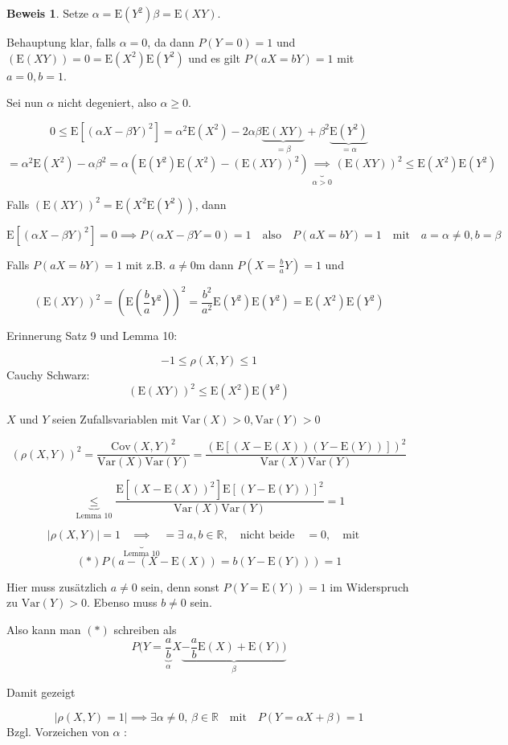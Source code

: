 \documentclass[12pt, a4paper]{article}
\newcommand{\E}{\mbox{I\negthinspace E}}
\theoremstyle{plain}
\theoremstyle{definition}
\newtheorem*{beweis}{Beweis}
\newcommand{\R}{\mathbb{R}}
\newcommand{\1}{\mathds{1}}
\renewcommand{\E}{\mathrm{E}}
\newcommand{\Var}{\mathrm{Var}}
\newcommand{\Cov}{\mathrm{Cov}}
\providecommand{\abs}[1]{\lvert#1\rvert}
\providecommand{\mtext}[1]{\quad \text{#1} \quad}
\begin{document}
\begin{beweis} Setze $\alpha = \E(Y^2) \beta=\E(XY)$. \end{beweis} Behauptung klar, falls $\alpha =0$, da dann $P(Y=0)=1$ und $(\E(XY)) = 0 = \E(X^2)\E(Y^2)$ und es gilt $P(aX=bY)=1$ mit $a=0, b=1$.

Sei nun $\alpha$ nicht degeniert, also $\alpha \geq 0$.

\[ 0\leq  \E[(\alpha X - \beta Y)^2] = \alpha^2 \E(X^2) - 2\alpha\beta \underbrace{\E(XY)}_{=\beta} + \beta^2\underbrace{\E(Y^2)}_{=\alpha} \]
\[=   \alpha^2 \E(X^2) - \alpha\beta^2 = \alpha( \E(Y^2)\E(X^2) - (\E(XY))^2)  \underbrace{\implies}_{\alpha>0} (\E(XY))^2 \leq \E(X^2)\E(Y^2)  \]

Falls $(\E(XY))^2 = \E(X^2 \E(Y^2))$, dann

\[  \E[(\alpha X -\beta Y)^2] = 0 \implies P(\alpha X - \beta Y = 0) = 1 \mtext{also} P(aX=bY)=1 \mtext{mit} a = \alpha \neq 0, b = \beta        \]

Falls $P(aX = bY) = 1$ mit z.B. $a \neq 0$m dann $P(X=\frac{b}{a}Y)=1$ und 

\[  (\E(XY))^2 = (\E(\frac{b}{a}Y^2))^2   = \frac{b^2}{a^2} \E(Y^2) \E(Y^2) = \E(X^2)\E(Y^2)   \]



Erinnerung Satz 9 und Lemma 10: 

\[-1 \leq \rho(X,Y) \leq 1\]
Cauchy Schwarz: \[(\E(XY))^2 \leq \E(X^2)\E(Y^2) \]


$X$ und $Y$ seien Zufallsvariablen mit $\Var(X) > 0, \Var (Y) > 0$

\[ (\rho(X,Y))^2 = \frac{\Cov(X,Y)^2}{\Var(X)\Var(Y)} = \frac{(\E[(X-\E(X)) (Y-\E(Y))])^2}{\Var(X)\Var(Y)}    \]

\[    \underbrace{\leq}_{\text{Lemma 10}} \frac{\E[(  X-\E(X) )^2]  \E[(Y-\E(Y))]^2  }{\Var(X)\Var(Y)} = 1         \]

\[ \abs{\rho(X,Y)} = 1 \underbrace{\implies}_{\text{Lemma 10}} = \exists \; a,b \in \R, \mtext{nicht beide} = 0, \mtext{mit}\]
\[ (*) P(a-(X-\E(X)) = b(Y-\E(Y)) ) = 1        \]

Hier muss zusätzlich $a \neq 0$ sein, denn sonst $P(Y=\E(Y)) = 1$ im Widerspruch zu $\Var(Y) > 0$. Ebenso muss $b \neq 0$ sein.

Also kann man $(*)$ schreiben als \[  P(Y = \underbrace{\frac{a}{b}}_{\alpha} X  \underbrace{- \frac{a}{b} \E(X) + \E(Y))}_{\beta}    \]

Damit gezeigt

\[   \abs{\rho(X,Y) = 1} \implies \exists \alpha \neq 0, \, \beta \in \R \mtext{mit} P(Y = \alpha X + \beta) = 1    \]
Bzgl. Vorzeichen von $\alpha$ : 
\end{document}
